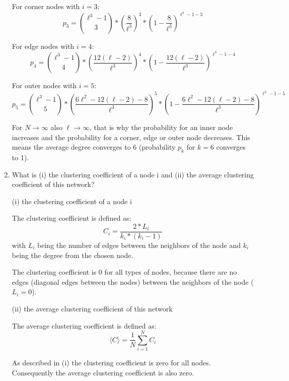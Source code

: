 \begin{enumerate}
	For corner nodes with $i=3$:
	\begin{equation*}
		p_3 = {{\ell^3-1}\choose{3}} * ({\frac{8}{\ell^3}})^3 * (1-{\frac{8}{\ell^3}})^{\ell^3-1-3}
	\end{equation*}
	
	For edge nodes with $i=4$:
	\begin{equation*}
		p_4 = {{\ell^3-1}\choose{4}} * ({\frac{12(\ell - 2)}{\ell^3}})^4 * (1-{\frac{12(\ell - 2)}{\ell^3}})^{\ell^3-1-4}
	\end{equation*}
	
	For outer nodes with $i=5$:
	\begin{equation*}
		p_5 = {{\ell^3-1}\choose{5}} * ({\frac{6\ell^2 - 12(\ell - 2) - 8}{\ell^3}})^5 * (1-{\frac{6\ell^2 - 12(\ell - 2) - 8}{\ell^3}})^{\ell^3-1-5}
	\end{equation*}
	
	For $N \rightarrow \infty$ also $\ell \rightarrow \infty$, that is why the probability for an inner node increases and the probability for a corner, edge or outer node decreases. This means the average degree converges to 6 (probability $p_k$ for $k=6$ converges to 1).
	
	\item What is (i) the clustering coefficient of a node i and (ii) the average clustering coefficient of this network?
	\vspace{0.25cm}
	
	(i) the clustering coefficient of a node i
	
	The clustering coefficient is defined as:
	\begin{equation*}
		C_i = \frac{2*L_i}{k_i * (k_i-1)}
	\end{equation*}
	with $L_i$ being the number of edges between the neighbors of the node and $k_i$ being the degree from the chosen node.
	
	The clustering coefficient is 0 for all types of nodes, because there are no edges (diagonal edges between the nodes) between the neighbors of the node ($L_i = 0$).
	
	(ii) the average clustering coefficient of this network
	
	The average clustering coefficient is defined as:
	\begin{equation*}
		\langle C \rangle = \frac{1}{N} \sum_{i=1}^{N} C_i
	\end{equation*}
	
	As described in (i) the clustering coefficient is zero for all nodes. Con\-se\-quent\-ly the average clustering coefficient is also zero.
	

\end{enumerate}
